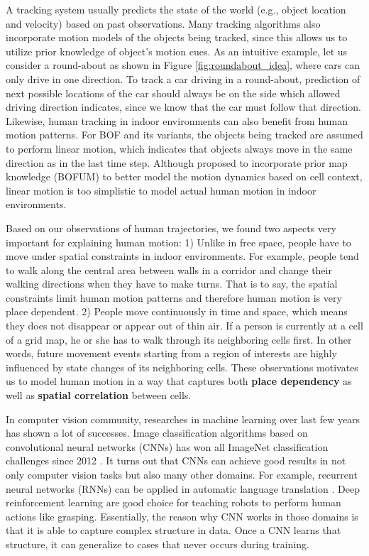 A tracking system usually predicts the state of the world (e.g., object location and velocity) based on past observations. Many tracking algorithms also incorporate motion models of the objects being tracked, since this allows us to utilize prior knowledge of object's motion cues. As an intuitive example, let us consider a round-about as shown in Figure \ref{fig:roundabout_idea}, where cars can only drive in one direction. To track a car driving in a round-about, prediction of next possible locations of the car should always be on the side which allowed driving direction indicates, since we know that the car must follow that direction. Likewise, human tracking in indoor environments can also benefit from human motion patterns. For BOF and its variants, the objects being tracked are assumed to perform linear motion, which indicates that objects always move in the same direction as in the last time step. Although \citet{gindele2009bayesian} proposed to incorporate prior map knowledge (BOFUM) to better model the motion dynamics based on cell context, linear motion is too simplistic to model actual human motion in indoor environments. 

Based on our observations of human trajectories, we found two aspects very important for explaining human motion: 1) Unlike in free space, people have to move under spatial constraints in indoor environments. For example, people tend to walk along the central area between walls in a corridor and change their walking directions when they have to make turns. That is to say, the spatial constraints limit human motion patterns and therefore human motion is very place dependent. 2) People move continuously in time and space, which means they does not disappear or appear out of thin air. If a person is currently at a cell of a grid map, he or she has to walk through its neighboring cells first. In other words, future movement events starting from a region of interests are highly influenced by state changes of its neighboring cells. These observations motivates us to model human motion in a way that captures both \textbf{place dependency} as well as \textbf{spatial correlation} between cells.

In computer vision community, researches in machine learning over last few years has shown a lot of successes. Image classification algorithms based on convolutional neural networks (CNNs) has won all ImageNet classification challenges since 2012 \citep{russakovsky2015imagenet}. It turns out that CNNs can achieve good results in not only computer vision tasks but also many other domains. For example, recurrent neural networks (RNNs) can be applied in automatic language translation \citep{cho2014learning}. Deep reinforcement learning are good choice for teaching robots to perform human actions like grasping\citep{levine2016learning}. Essentially, the reason why CNN works in those domains is that it is able to capture complex structure in data. Once a CNN learns that structure, it can generalize to cases that never occurs during training. 

